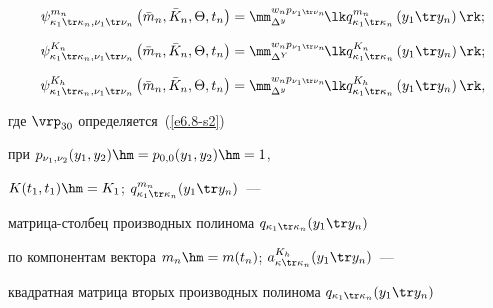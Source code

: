 \noindent

\begin{equation}

\psi_{\kappa_1\tr \kappa_n, \nu_1\tr \nu_n}^{m_n} 

\left(\bar m_n, \bar K_n, \Theta, t_n\right) = 

\mm_{\Delta^y}^{w_n p_{\nu_1\tr \nu_n}}\! \lk q_{\kappa_1\tr \kappa_n}^{m_n} 

\left(y_1\tr y_n\right)\rk;\!\!\!

\label{e6.9-s2}

\end{equation}

\begin{equation}

 \psi_{\kappa_1\tr \kappa_n, \nu_1\tr \nu_n}^{K_n} 

 \left(\bar m_n, \bar K_n, \Theta, t_n\right)= 

 \mm_{\Delta^Y}^{w_n p_{\nu_1\tr \nu_n}}\! \lk q_{\kappa_1\tr \kappa_n}^{K_n} 

 \left(y_1\tr y_n\right)\rk;\!\!\!

 \label{e6.10-s2}

 \end{equation}

\begin{equation}

\psi_{\kappa_1\tr \kappa_n, \nu_1\tr \nu_n}^{K_h} 

\left(\bar m_n, \bar K_n, \Theta, t_n\right)= 

\mm_{\Delta^y}^{w_n p_{\nu_1\tr \nu_n}} \!\lk q_{\kappa_1\tr \kappa_n}^{K_h} 

\left(y_1\tr y_n\right)\rk,\!\!\!

\label{e6.11-s2}

\end{equation}

где $\vrp_{30}$ определяется~(\ref{e6.8-s2}) 

при $p_{\nu_1, \nu_2} (y_1, y_2)\hm= p_{0,0} (y_1, y_2) \hm=1$, 

$K(t_1, t_1) \hm= K_1$; $q_{\kappa_1\tr \kappa_n}^{m_n} (y_1\tr y_n)$~--- 

мат\-ри\-ца-стол\-бец производных полинома $q_{\kappa_1\tr \kappa_n} (y_1\tr y_n)$ 

по компонентам вектора $m_n \hm= m(t_n)$; $a_{\kappa\tr \kappa_n}^{K_h} (y_1\tr y_n)$~--- 

квадратная матрица вторых производных полинома $q_{\kappa_1\tr \kappa_n} (y_1\tr y_n)$ 

